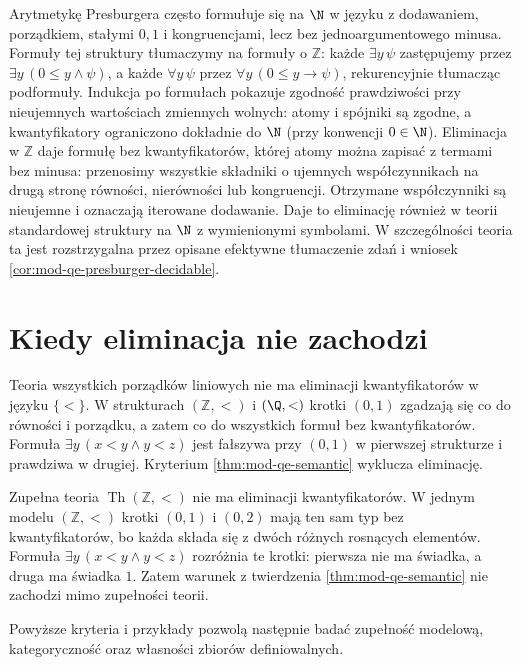 \begin{uwaga}
\label{rem:mod-qe-presburger-naturals}
Arytmetykę Presburgera często formułuje się na $\N$
w języku z dodawaniem, porządkiem, stałymi $0,1$
i kongruencjami, lecz bez jednoargumentowego minusa.
Formuły tej struktury tłumaczymy na formuły o $\mathbb Z$:
każde $\exists y\,\psi$ zastępujemy przez
$\exists y\,(0\leq y\land\psi)$, a każde
$\forall y\,\psi$ przez $\forall y\,(0\leq y\to\psi)$,
rekurencyjnie tłumacząc podformuły.
Indukcja po formułach pokazuje zgodność prawdziwości
przy nieujemnych wartościach zmiennych wolnych:
atomy i spójniki są zgodne, a kwantyfikatory
ograniczono dokładnie do $\N$ (przy konwencji $0\in\N$).
Eliminacja w $\mathbb Z$ daje formułę bez kwantyfikatorów,
której atomy można zapisać z termami bez minusa:
przenosimy wszystkie składniki o ujemnych
współczynnikach na drugą stronę równości, nierówności
lub kongruencji. Otrzymane współczynniki są nieujemne
i oznaczają iterowane dodawanie. Daje to eliminację
również w teorii standardowej struktury na $\N$
z wymienionymi symbolami. W szczególności teoria
ta jest rozstrzygalna przez opisane efektywne
tłumaczenie zdań i wniosek
\ref{cor:mod-qe-presburger-decidable}.
\end{uwaga}

\section{Kiedy eliminacja nie zachodzi}
\begin{przyklad}
\label{ex:mod-qe-not-linear-orders}
Teoria wszystkich porządków liniowych nie ma eliminacji
kwantyfikatorów w języku $\{<\}$. W strukturach
$(\mathbb Z,<)$ i $(\Q,<)$ krotki $(0,1)$ zgadzają się
co do równości i porządku, a zatem co do wszystkich
formuł bez kwantyfikatorów. Formuła
$\exists y\,(x<y\land y<z)$ jest fałszywa przy $(0,1)$
w pierwszej strukturze i prawdziwa w drugiej.
Kryterium \ref{thm:mod-qe-semantic} wyklucza eliminację.
\end{przyklad}

\begin{przyklad}
\label{ex:mod-qe-complete-not-qe}
Zupełna teoria $\operatorname{Th}(\mathbb Z,<)$
nie ma eliminacji kwantyfikatorów.
W jednym modelu $(\mathbb Z,<)$ krotki $(0,1)$
i $(0,2)$ mają ten sam typ bez kwantyfikatorów,
bo każda składa się z dwóch różnych rosnących elementów.
Formuła $\exists y\,(x<y\land y<z)$ rozróżnia te krotki:
pierwsza nie ma świadka, a druga ma świadka $1$.
Zatem warunek z twierdzenia \ref{thm:mod-qe-semantic}
nie zachodzi mimo zupełności teorii.
\end{przyklad}

Powyższe kryteria i przykłady pozwolą następnie badać
zupełność modelową, kategoryczność oraz własności
zbiorów definiowalnych.
